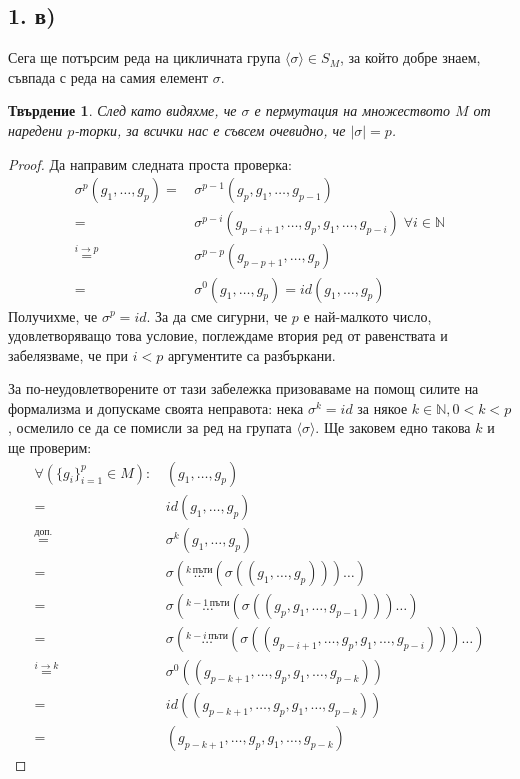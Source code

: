 \documentclass{article}
\newtheorem*{prop}{Твърдение}
\newcommand{\grsigma}[0]{{\langle \sigma \rangle}}
\begin{document}
\subsection*{1. в)}
Сега ще потърсим реда на цикличната група $\grsigma \in S_M$, за който добре знаем, съвпада с реда на самия елемент $\sigma$.

\begin{prop}
    След като видяхме, че $\sigma$ е пермутация на множеството $M$ от наредени $p$-торки, за всички нас е съвсем очевидно, че $|\sigma| = p$.
\end{prop}
\begin{proof}
    Да направим следната проста проверка:
    \begin{align*}
        \sigma^p(g_1,\dots, g_p) =\,&\sigma^{p-1}(g_p, g_1,\dots, g_{p-1}) \\
        =\,&\sigma^{p-i}(g_{p-i+1},\dots,g_p,g_1,\dots,g_{p-i})\;\forall i\in\mathbb N\\
        \overset{i \rightarrow p}{=}\,&\sigma^{p-p}(g_{p-p+1},\dots,g_p)\\
        =\,&\sigma^{0}(g_{1},\dots,g_p) = id(g_{1},\dots,g_p)
    \end{align*}
    Получихме, че $\sigma^p = id$.
    За да сме сигурни, че $p$ е най-малкото число, удовлетворяващо това условие,
    поглеждаме втория ред от равенствата и забелязваме, че при $i<p$ аргументите са разбъркани.

    За по-неудовлетворените от тази забележка призоваваме на помощ силите на формализма и допускаме своята неправота: нека $\sigma^k = id$ за някое $k \in \mathbb N, 0 < k < p$, осмелило се да се помисли за ред на групата $\grsigma$.
    Ще заковем едно такова $k$ и ще проверим:
    \begin{align*}
        \forall (\{g_i\}_{i=1}^p \in M)\!:\, &(g_1,\dots, g_p) \\
        =\,&id(g_1,\dots, g_p) \\
        \overset{\textit{доп.}}{=}\,&\sigma^k(g_1, \dots, g_p)\\
        =\,&\sigma(\overset{k\,\text{пъти}}{\dots}   ( \sigma( (g_1,\dots, g_p)))\dots)\\
        =\,&\sigma(\overset{k-1\,\text{пъти}}{\dots} ( \sigma( (g_p, g_1,\dots, g_{p-1})))\dots)\\
        =\,&\sigma(\overset{k-i\,\text{пъти}}{\dots} ( \sigma( (g_{p-i+1}, \dots, g_p, g_1,\dots, g_{p-i})))\dots)\\
        \overset{i\rightarrow k}{=}\,&\sigma^0( (g_{p-k+1}, \dots, g_p, g_1,\dots, g_{p-k})) \\
        =\,&id( (g_{p-k+1}, \dots, g_p, g_1,\dots, g_{p-k}))\\
        =\,&(g_{p-k+1}, \dots, g_p, g_1,\dots, g_{p-k})
    \end{align*}


\end{proof}
\end{document}

